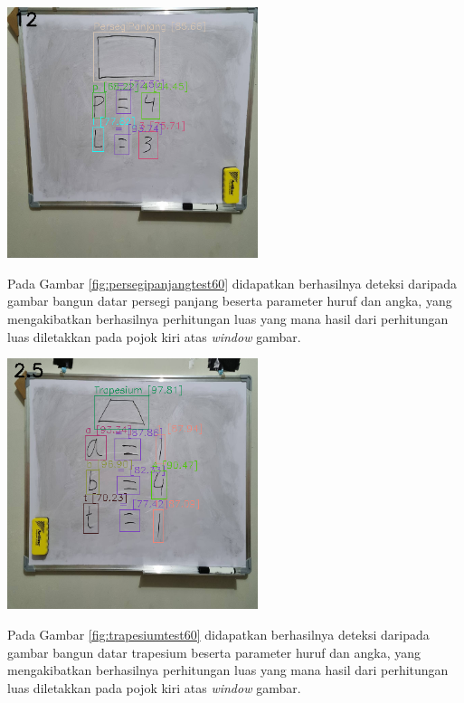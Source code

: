 \begin{center}
	\includegraphics[width=0.55\textwidth]{gambar/pp60hasil.png}
	\label{fig:persegipanjangtest60}
\end{center}
Pada Gambar \ref{fig:persegipanjangtest60} didapatkan berhasilnya deteksi daripada gambar bangun datar persegi panjang beserta parameter huruf dan angka, yang mengakibatkan berhasilnya perhitungan luas yang mana hasil dari perhitungan luas diletakkan pada pojok kiri atas \textit{window} gambar.

\begin{center}
	\includegraphics[width=0.55\textwidth]{gambar/trap60hasil.png}
	\label{fig:trapesiumtest60}
\end{center}
Pada Gambar \ref{fig:trapesiumtest60} didapatkan berhasilnya deteksi daripada gambar bangun datar trapesium beserta parameter huruf dan angka, yang mengakibatkan berhasilnya perhitungan luas yang mana hasil dari perhitungan luas diletakkan pada pojok kiri atas \textit{window} gambar.

